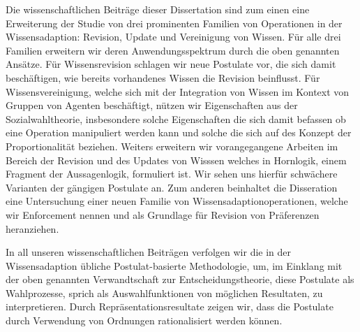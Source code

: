 Die wissenschaftlichen Beitr\"age dieser Dissertation sind zum einen eine Erweiterung der Studie von drei prominenten Familien von Operationen in der Wissensadaption: Revision, Update und Vereinigung von Wissen. F\"ur alle drei Familien erweitern wir deren Anwendungsspektrum durch die oben genannten Ans\"atze. F\"ur Wissensrevision schlagen wir neue Postulate vor, die sich damit besch\"aftigen, wie bereits vorhandenes Wissen die Revision beinflusst. F\"ur Wissensvereinigung, welche sich mit der Integration von Wissen im Kontext von Gruppen von Agenten besch\"aftigt, n\"utzen wir Eigenschaften aus der Sozialwahltheorie, insbesondere solche Eigenschaften die sich damit befassen ob eine Operation manipuliert werden kann und solche die sich auf des Konzept der Proportionalit\"at beziehen. Weiters erweitern wir vorangegangene Arbeiten im Bereich der Revision und des Updates von Wisssen welches in Hornlogik, einem Fragment der Aussagenlogik, formuliert ist. Wir sehen uns hierf\"ur schw\"achere Varianten der g\"angigen Postulate an. Zum anderen beinhaltet die Disseration eine Untersuchung einer neuen Familie von Wissensadaptionoperationen, welche wir Enforcement nennen und als Grundlage f\"ur Revision von Pr\"aferenzen heranziehen.

In all unseren wissenschaftlichen Beitr\"agen verfolgen wir die in der Wissensadaption \"ubliche Postulat-basierte Methodologie, um, im Einklang mit der oben genannten Verwandtschaft zur Entscheidungstheorie, diese Postulate als Wahlprozesse, sprich als Auswahlfunktionen von möglichen Resultaten, zu interpretieren. Durch Repr\"asentationsresultate zeigen wir, dass die Postulate durch Verwendung von Ordnungen rationalisiert werden können.